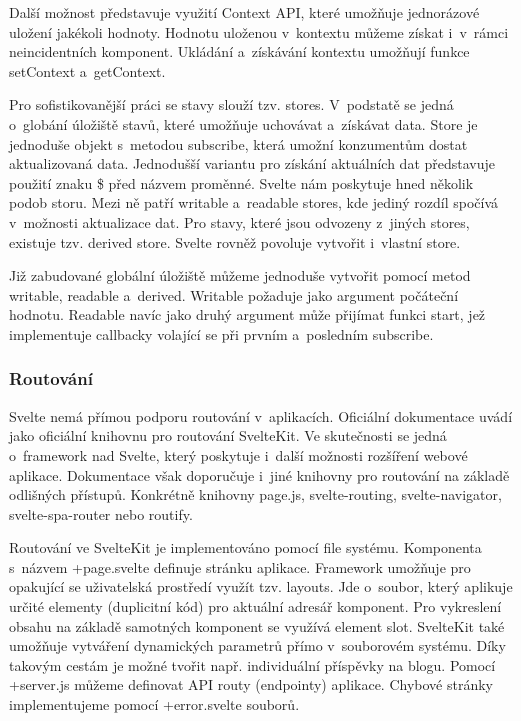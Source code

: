 Další možnost představuje využití Context API, které umožňuje jednorázové uložení jakékoli hodnoty. 
Hodnotu uloženou v~kontextu můžeme získat i~v~rámci neincidentních komponent. Ukládání a~získávání kontextu umožňují funkce setContext a~getContext.

Pro sofistikovanější práci se stavy slouží tzv. stores. V~podstatě se jedná o~globání úložiště stavů, které umožňuje uchovávat a~získávat data. 
Store je jednoduše objekt s~metodou subscribe, která umožní konzumentům dostat aktualizovaná data. 
Jednodušší variantu pro získání aktuálních dat představuje použití znaku \$ před názvem proměnné. Svelte nám poskytuje hned několik podob storu. 
Mezi ně patří writable a~readable stores, kde jediný rozdíl spočívá v~možnosti aktualizace dat. 
Pro stavy, které jsou odvozeny z~jiných stores, existuje tzv. derived store. Svelte rovněž povoluje vytvořit i~vlastní store. 

Již zabudované globální úložiště můžeme jednoduše vytvořit pomocí metod writable, readable a~derived. Writable požaduje jako argument počáteční hodnotu. 
Readable navíc jako druhý argument může přijímat funkci start, jež implementuje callbacky volající se při prvním a~posledním subscribe.\cite{sveltehandbook,svelte,sveltestatemanagement}

\subsubsection{Routování}

Svelte nemá přímou podporu routování v~aplikacích. Oficiální dokumentace uvádí jako oficiální knihovnu pro routování SvelteKit. 
Ve skutečnosti se jedná o~framework nad Svelte, který poskytuje i~další možnosti rozšíření webové aplikace. 
Dokumentace však doporučuje i~jiné knihovny pro routování na základě odlišných přístupů. 
Konkrétně knihovny page.js, svelte-routing, svelte-navigator, svelte-spa-router nebo routify.\cite{svelte,svelteforbeginners}

Routování ve SvelteKit je implementováno pomocí file systému. Komponenta s~názvem +page.svelte definuje stránku aplikace. 
Framework umožňuje pro opakující se uživatelská prostředí využít tzv. layouts. Jde o~soubor, který aplikuje určité elementy (duplicitní kód) pro aktuální adresář komponent. 
Pro vykreslení obsahu na základě samotných komponent se využívá element slot. SvelteKit také umožňuje vytváření dynamických parametrů přímo v~souborovém systému. 
Díky takovým cestám je možné tvořit např. individuální příspěvky na blogu. Pomocí +server.js můžeme definovat API routy (endpointy) aplikace. 
Chybové stránky implementujeme pomocí +error.svelte souborů.\cite{svelte,sveltekit}

